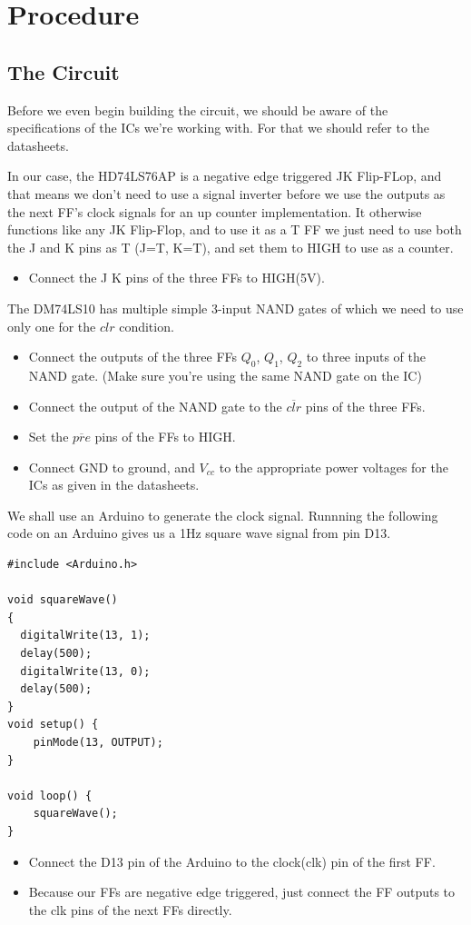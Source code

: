 \documentclass[a4paper,12pt]{article}
\begin{document}
\section{Procedure}
\subsection{The Circuit}
Before we even begin building the circuit, we should be aware of the specifications of the ICs we're working with. For that we should refer to the datasheets. 

In our case, the HD74LS76AP is a negative edge triggered JK Flip-FLop, and that means we don't need to use a signal inverter before we use the outputs as the next FF's clock signals for an up counter implementation. It otherwise functions like any JK Flip-Flop, and to use it as a T FF we just need to use both the J and K pins as T (J=T, K=T), and set them to HIGH to use as a counter. 
\begin{itemize}
    \item Connect the J K pins of the three FFs to HIGH(5V). 
\end{itemize}	
The DM74LS10 has multiple simple 3-input NAND gates of which we need to use only one for the $clr$ condition.
\begin{itemize}
    \item Connect the outputs of the three FFs $Q_0$, $Q_1$, $Q_2$ to three inputs of the NAND gate. (Make sure you're using the same NAND gate on the IC)
    \item Connect the output of the NAND gate to the $\overline{clr}$ pins of the three FFs.
    \item Set the $\overline{pre}$ pins of the FFs to HIGH.
    \item Connect GND to ground, and $V_{cc}$ to the appropriate power voltages for the ICs as given in the datasheets. 
\end{itemize}
We shall use an Arduino to generate the clock signal. Runnning the following code on an Arduino gives us a 1Hz square wave signal from pin D13.

\begin{verbatim}
#include <Arduino.h>

void squareWave()
{
  digitalWrite(13, 1);
  delay(500);
  digitalWrite(13, 0);
  delay(500);
}
void setup() {
    pinMode(13, OUTPUT);  
}

void loop() {
    squareWave();
}
\end{verbatim}
\begin{itemize}
    \item Connect the D13 pin of the Arduino to the clock(clk) pin of the first FF.
    \item Because our FFs are negative edge triggered, just connect the FF outputs to the clk pins of the next FFs directly.
\end{itemize}
\end{document}
